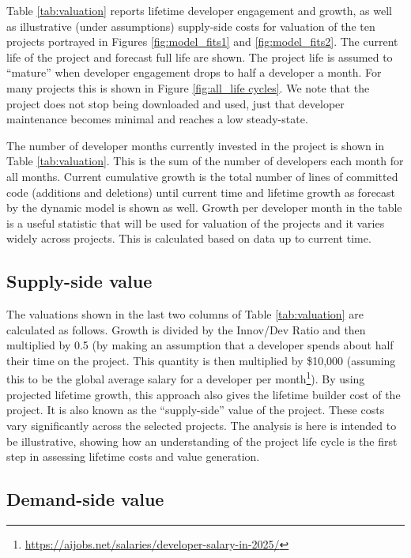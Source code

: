 \documentclass[conference]{IEEEtran}
\begin{document}
Table \ref{tab:valuation} reports lifetime developer engagement and growth, as well as illustrative (under assumptions) supply-side costs for valuation of the ten projects portrayed in Figures \ref{fig:model_fits1} and \ref{fig:model_fits2}. The current life of the project and forecast full life are shown. The project life is assumed to ``mature'' when developer engagement drops to half a developer a month. For many projects this is shown in Figure \ref{fig:all_life cycles}. We note that the project does not stop being downloaded and used, just that developer maintenance becomes minimal and reaches a low steady-state. 

The number of developer months currently invested in the project is shown in Table \ref{tab:valuation}. This is the sum of the number of developers each month for all months. Current cumulative growth is the total number of lines of committed code (additions and deletions) until current time and lifetime growth as forecast by the dynamic model is shown as well. Growth per developer month in the table is a useful statistic that will be used for valuation of the projects and it varies widely across projects. This is calculated based on data up to current time. 

\subsection{Supply-side value}

The valuations shown in the last two columns of Table \ref{tab:valuation} are calculated as follows. Growth is divided by the Innov/Dev Ratio and then multiplied by 0.5 (by making an assumption that a developer spends about half their time on the project. This quantity is then multiplied by \$10,000 (assuming this to be the global average salary for a developer per month\footnote{\url{https://aijobs.net/salaries/developer-salary-in-2025/}}). By using projected lifetime growth, this approach also gives the lifetime builder cost of the project. It is also known as the ``supply-side'' value of the project. These costs vary significantly across the selected projects. The analysis is here is intended to be illustrative, showing how an understanding of the project life cycle is the first step in assessing lifetime costs and value generation. 

\subsection{Demand-side value}
\end{document}
